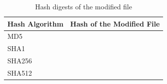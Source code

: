 \documentclass[11pt,letterpaper]{article}
\begin{document}
\begin{enumerate}
				
				
				
				
		
		\begin{table}[h]
			\caption{Hash digests of the modified file
			} \label{tab:hash-digest-modifiedhashfile}
			\begin{tabularx}{\columnwidth}{|p{4cm}|X|}
				\hline
				\textbf{Hash Algorithm} & \textbf{Hash of the Modified File} \\
				\hline
				MD5 & \\ \hline
				
				\hline
				SHA1 & \\ \hline
				
				\hline
				SHA256 &  \\ \hline
				
				\hline
				SHA512 & \\ \hline
				
			\end{tabularx}
		\end{table}
		
		

\end{enumerate}
\end{document}

